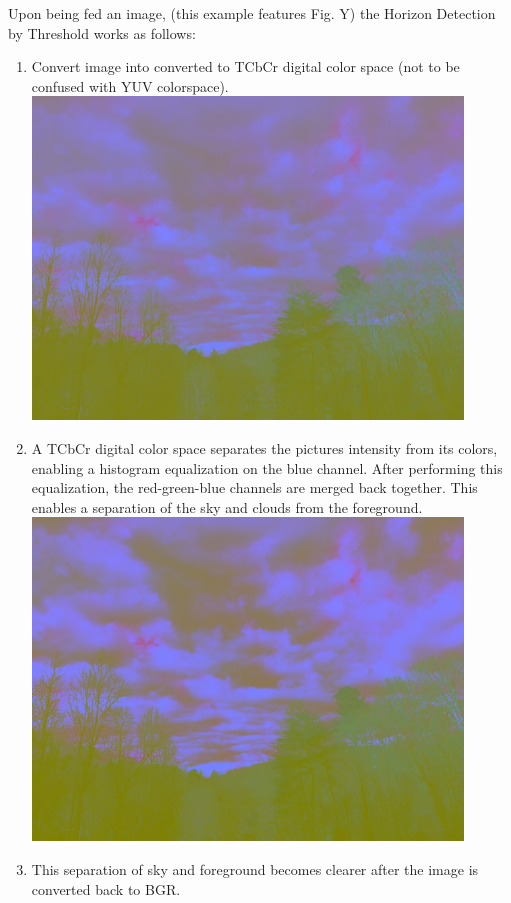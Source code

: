 \documentclass[onecolumn, draftclsnofoot,10pt, compsoc]{IEEEtran}
\begin{document}
\begin{singlespace}
					Upon being fed an image, (this example features Fig.
		Y) the Horizon Detection by Threshold works as follows:
					\begin{enumerate}
						\item Convert image into converted to TCbCr digital color space (not to be confused with YUV colorspace).\\
							\includegraphics[width=4.5in,natwidth=640,natheight=480]{images/threshold/1.jpg}
						\item A TCbCr digital color space separates the pictures intensity from its colors, enabling a histogram equalization on the blue channel.
		After performing this equalization, the red-green-blue channels are merged back together.
		This enables a separation of the sky and clouds from the foreground.\\
							\includegraphics[width=4.5in,natwidth=640,natheight=480]{images/threshold/2.jpg}
						\item This separation of sky and foreground becomes clearer after the image is converted back to BGR.\\

\end{enumerate}
\end{singlespace}
\end{document}
